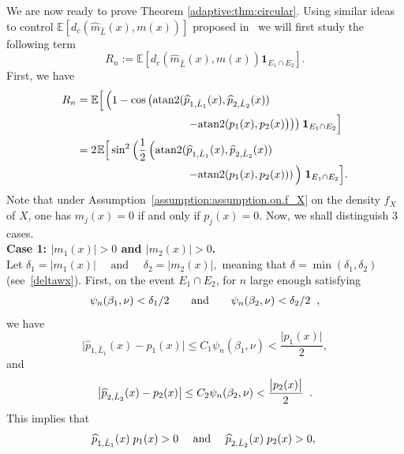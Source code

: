 \documentclass[11pt,a4paper,openany]{article}
\newcommand{\Atan}{\mbox{atan2}}
\def\E{\mathbb{E}}
\begin{document}
We are now ready to prove  Theorem   \ref{adaptive:thm:circular}. Using similar ideas to control $\E \left [  d_c ( \widehat{m}_{\hat L}(x), m(x))  \right ]$ proposed  in~\cite{Nguyen-PhamNgoc-Rivoirard} we will first study the following term 
$$R_{n}  :=  \E \left [  d_c ( \widehat{m}_{\hat L}(x), m(x))  \mathbf{1}_{E_1 \cap  E_2 } \right ].$$
First, we have
\begin{align*}
	R_{n}  &=  \E \Big[ \left ( 1- \cos \big(\Atan( \widehat{p}_{1, \hat L_1}(x) , \widehat{p}_{2, \hat L_2}(x))  \right. 
	\\
	& \hspace{3.5cm}  \left. -  \Atan( p_{1}(x) ,  p_{2}(x) \big)\big) \right )   \hspace{0.02cm}   \mathbf{1}_{E_1 \cap E_2}  \Big]\\
	&= 2  \hspace{0.02cm}  \E  \Big[ \sin^2  \Big( \frac{1}{2}  \left(  \Atan( \widehat{p}_{1, \hat L_1}(x) ,  \widehat{p}_{2, \hat L_2}(x))  
	\right.    
	\\
	& \hspace{3.5cm}  \left.  -  \Atan ( p_{1}(x), p_{2}(x))  \right ) \Big)  \hspace{0.1cm}   \mathbf{1}_{E_1 \cap {E}_{2 } }\Big].
\end{align*}
Note that under Assumption~\eqref{assumption:assumption.on.f_X} on the density $f_{X}$ of $X$, one has $m_{j}(x) = 0$ if and only if $p_{j}(x) = 0$. Now, we shall distinguish 3 cases.
\\[0.2cm]
\textbf{Case 1: $|m_1(x)|>0$ and  $|m_2(x)|>0$.}
\\[0.2cm] 
Let 
$\delta_1 = |m_1(x)| \quad \mbox{ and } \quad \delta_2 = |m_2(x)|,$ 
meaning that $\delta=\min( \delta_1,\delta_2)$ (see~\eqref{deltawx}). 
First, on the event $E_1 \cap E_2$, for $n$ large enough satisfying 
\begin{align*}
 \psi_{n}(\beta_{1}, \nu)  <  \delta_{1}/2
\qquad  
\mbox{and}
\qquad 
  \psi_{n}(\beta_{2}, \nu)  <  \delta_{2}/2  \hspace{0.2cm} ,  \end{align*}
we have 
$$\big| \widehat{p}_{1, \hat L_1}(x) - p_{1}(x) \big| 
\leq   C_{1}  \psi_{n}(\beta_{1}, \nu) 
<  \dfrac{\big| p_{1}(x)\big|}{2}  ,
$$ 
and 
$$
\big|   \widehat{p}_{2, \hat L_2}(x) - p_{2}(x) \big|   \leq   C_{2}     \psi_{n}(\beta_{2}, \nu)   < \dfrac{\big| p_{2}(x) \big|}{2} \hspace{0.2cm}  . 
$$ 
This implies that 
$$ \widehat{p}_{1, \hat L_1}(x)  \hspace{0.1cm}  p_{1}(x) > 0
\quad  \mbox{ and }  \quad   
 \widehat{p}_{2, \hat L_2}(x)  \hspace{0.1cm} p_{2}(x) > 0,  \hspace{0.1cm}
$$    
\end{document}
